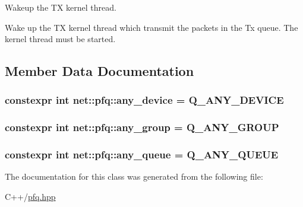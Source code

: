 Wakeup the T\+X kernel thread. 

Wake up the T\+X kernel thread which transmit the packets in the Tx queue. The kernel thread must be started. 

\subsection{Member Data Documentation}
\hypertarget{classnet_1_1pfq_a8ecbb4cb4e632b85865a6c77fd4a6a45}{
\subsubsection[{any\+\_\+device}]{\setlength{\rightskip}{0pt plus 5cm}constexpr int net\+::pfq\+::any\+\_\+device = Q\+\_\+\+A\+N\+Y\+\_\+\+D\+E\+V\+I\+C\+E\hspace{0.3cm}{\ttfamily [static]}}}\label{classnet_1_1pfq_a8ecbb4cb4e632b85865a6c77fd4a6a45}
\hypertarget{classnet_1_1pfq_a3aa94e5b77640a4db592893fa9220e81}{
\subsubsection[{any\+\_\+group}]{\setlength{\rightskip}{0pt plus 5cm}constexpr int net\+::pfq\+::any\+\_\+group = Q\+\_\+\+A\+N\+Y\+\_\+\+G\+R\+O\+U\+P\hspace{0.3cm}{\ttfamily [static]}}}\label{classnet_1_1pfq_a3aa94e5b77640a4db592893fa9220e81}
\hypertarget{classnet_1_1pfq_a0d4eca6d0925b7c49365675c9cf9385c}{
\subsubsection[{any\+\_\+queue}]{\setlength{\rightskip}{0pt plus 5cm}constexpr int net\+::pfq\+::any\+\_\+queue = Q\+\_\+\+A\+N\+Y\+\_\+\+Q\+U\+E\+U\+E\hspace{0.3cm}{\ttfamily [static]}}}\label{classnet_1_1pfq_a0d4eca6d0925b7c49365675c9cf9385c}


The documentation for this class was generated from the following file\+:\begin{DoxyCompactItemize}
\item 
C++/\hyperlink{pfq_8hpp}{pfq.\+hpp}\end{DoxyCompactItemize}
